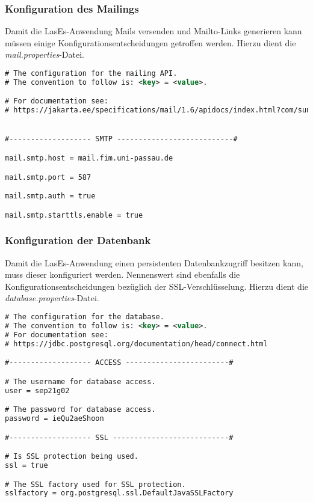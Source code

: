 \subsubsection{Konfiguration des Mailings}
Damit die LasEs-Anwendung Mails versenden und Mailto-Links generieren kann
müssen einige Konfigurationsentscheidungen getroffen werden.
Hierzu dient die \emph{mail.properties}-Datei.

\begin{lstlisting}[language=XML, caption = Die Mailingkonfiguration \emph{mail.properties}]
# The configuration for the mailing API.
# The convention to follow is: <key> = <value>.

# For documentation see:
# https://jakarta.ee/specifications/mail/1.6/apidocs/index.html?com/sun/mail/smtp/package-summary.html


#------------------- SMTP ---------------------------#

mail.smtp.host = mail.fim.uni-passau.de

mail.smtp.port = 587

mail.smtp.auth = true

mail.smtp.starttls.enable = true
\end{lstlisting}

\subsubsection{Konfiguration der Datenbank}
Damit die LasEs-Anwendung einen persistenten Datenbankzugriff besitzen kann,
muss dieser konfiguriert werden. Nennenswert sind ebenfalls die
Konfigurationsentscheidungen bezüglich der SSL-Verschlüsselung.
Hierzu dient die \emph{database.properties}-Datei.

\begin{lstlisting}[language=XML, caption = Die Datenbankkonfiguration \emph{database.properties}]
# The configuration for the database.
# The convention to follow is: <key> = <value>.
# For documentation see:
# https://jdbc.postgresql.org/documentation/head/connect.html

#------------------- ACCESS ------------------------#

# The username for database access.
user = sep21g02

# The password for database access.
password = ieQu2aeShoon

#------------------- SSL ---------------------------#

# Is SSL protection being used.
ssl = true

# The SSL factory used for SSL protection.
sslfactory = org.postgresql.ssl.DefaultJavaSSLFactory
\end{lstlisting}


